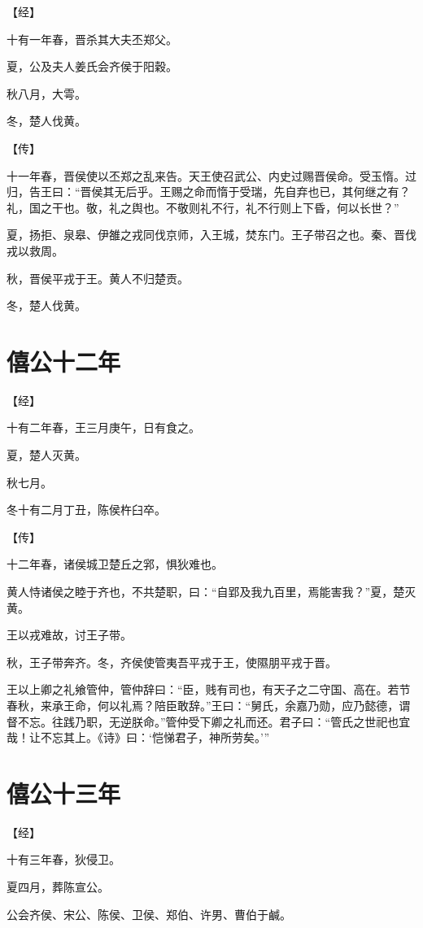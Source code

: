 \documentclass[a4paper,12pt,UTF8,twoside]{ctexbook}
\begin{document}
【经】

十有一年春，晋杀其大夫丕郑父。

夏，公及夫人姜氏会齐侯于阳穀。

秋八月，大雩。

冬，楚人伐黄。

【传】

十一年春，晋侯使以丕郑之乱来告。天王使召武公、内史过赐晋侯命。受玉惰。过归，告王曰：“晋侯其无后乎。王赐之命而惰于受瑞，先自弃也已，其何继之有？礼，国之干也。敬，礼之舆也。不敬则礼不行，礼不行则上下昏，何以长世？”

夏，扬拒、泉皋、伊雒之戎同伐京师，入王城，焚东门。王子带召之也。秦、晋伐戎以救周。

秋，晋侯平戎于王。黄人不归楚贡。

冬，楚人伐黄。


\section{僖公十二年}



【经】

十有二年春，王三月庚午，日有食之。

夏，楚人灭黄。

秋七月。

冬十有二月丁丑，陈侯杵臼卒。

【传】

十二年春，诸侯城卫楚丘之郛，惧狄难也。

黄人恃诸侯之睦于齐也，不共楚职，曰：“自郢及我九百里，焉能害我？”夏，楚灭黄。

王以戎难故，讨王子带。

秋，王子带奔齐。冬，齐侯使管夷吾平戎于王，使隰朋平戎于晋。

王以上卿之礼飨管仲，管仲辞曰：“臣，贱有司也，有天子之二守国、高在。若节春秋，来承王命，何以礼焉？陪臣敢辞。”王曰：“舅氏，余嘉乃勋，应乃懿德，谓督不忘。往践乃职，无逆朕命。”管仲受下卿之礼而还。君子曰：“管氏之世祀也宜哉！让不忘其上。《诗》曰：‘恺悌君子，神所劳矣。’”

\section{僖公十三年}


【经】

十有三年春，狄侵卫。

夏四月，葬陈宣公。

公会齐侯、宋公、陈侯、卫侯、郑伯、许男、曹伯于鹹。
\end{document}
